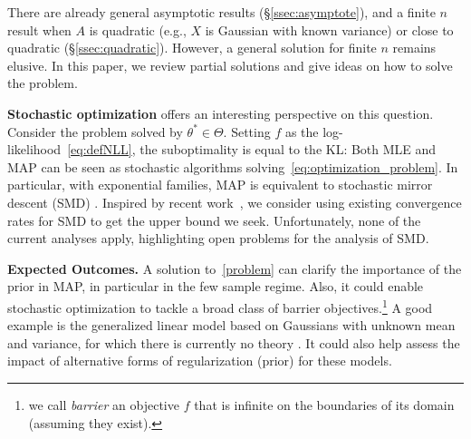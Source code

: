 \documentclass[twoside]{article}
\newcommand{\logpart}{A}
\newcommand{\nat}{\theta}
\begin{document}
There are already general asymptotic results (\S\ref{ssec:asymptote}), and a finite $n$ result when $\logpart$ is quadratic (e.g., $X$ is Gaussian with known variance)
or close to quadratic (\S\ref{ssec:quadratic}).
However, a  general solution for finite $n$ remains elusive.
In this paper, we review partial solutions and give ideas on how to solve the problem.

{\bf Stochastic optimization} offers an interesting perspective on this question.
Consider the problem
solved by $\nat^*\in \Theta$.
Setting $f$ as the log-likelihood~\eqref{eq:defNLL}, the suboptimality is equal to the KL:
\alignn{
	f(\nat) - f(\nat^*) = \KL\paren{p_{\nat^*} || p_{\nat} } .
	\label{eq:suboptimalityKL}
}
Both MLE and MAP can be seen as stochastic algorithms solving~\eqref{eq:optimization_problem}.
In particular, with exponential families, MAP is equivalent to stochastic mirror descent (SMD) \citep{nemirovski2009robust}.
Inspired by recent work~\citep{lepriol2021analysis, kunstner2020homeomorphic}, we consider using existing convergence rates for SMD to get the upper bound we seek.
Unfortunately, none of the current analyses apply, highlighting open problems for the analysis of SMD.

{\bf Expected Outcomes.}
A solution to~\eqref{problem} can clarify the importance of the prior in MAP, in particular in the few sample regime. %
Also, it could enable stochastic optimization to tackle a broad class of barrier objectives.\footnote{we call \emph{barrier} an objective $f$ that is infinite on the boundaries of its domain (assuming they exist).}
A good example is the generalized linear model based on Gaussians with unknown mean and variance, for which there is currently no theory \citep{bach2013nonstronglyconvex}.
It could also help assess the impact of alternative forms of regularization (prior) for these models.
\end{document}
